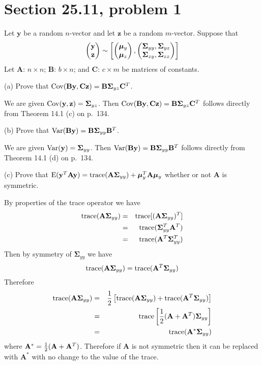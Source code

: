 
\section{Section 25.11, problem 1}
Let $\mathbf y$ be a random $n$-vector and let $\mathbf z$
be a random $m$-vector. Suppose that
\[
\begin{pmatrix}
\mathbf y\cr
\mathbf z
\end{pmatrix}\sim\left[
\begin{pmatrix}
\bm\mu_y\cr
\bm\mu_z
\end{pmatrix},\begin{pmatrix}
\bm\Sigma_{yy},\bm\Sigma_{yz}\cr
\bm\Sigma_{zy},\bm\Sigma_{zz}
\end{pmatrix}
\right]
\]
Let $\mathbf A$: $n\times n$;
$\mathbf B$: $b\times n$;
and $\mathbf C$: $c\times m$ be matrices of constants.

\bigskip
\noindent
(a) Prove that $\mathop{\rm Cov}(\mathbf{By},\mathbf{Cz})
=\mathbf{B\Sigma}_{yz}\mathbf C^T$.

\bigskip
\noindent
We are given $\mathop{\rm Cov}(\mathbf y,\mathbf z)=\bm\Sigma_{yz}$.
Then $\mathop{\rm Cov}(\mathbf{By},\mathbf{Cz})
=\mathbf{B\Sigma}_{yz}\mathbf C^T$
follows directly from Theorem 14.1 (c) on p.\ 134.

\bigskip
\noindent
(b) Prove that $\mathop{\rm Var}(\mathbf{By})
=\mathbf{B\Sigma}_{yy}\mathbf B^T$.

\bigskip
\noindent
We are given $\mathop{\rm Var}(\mathbf y)=\bm\Sigma_{yy}$.
Then $\mathop{\rm Var}(\mathbf{By})
=\mathbf{B\Sigma}_{yy}\mathbf B^T$
follows directly from Theorem 14.1 (d) on p.\ 134.

\bigskip
\noindent
(c) Prove that
$\mathrm E(\mathbf y^T\mathbf{Ay})
=\mathop{\rm trace}(\mathbf{A\Sigma}_{yy})
+\bm\mu_y^T\mathbf A\bm\mu_y$
whether or not $\mathbf A$ is symmetric.

\bigskip
\noindent
By properties of the trace operator we have
\begin{eqnarray*}
\mathop{\rm trace}(\mathbf A\bm\Sigma_{yy})
&=&\mathop{\rm trace}[(\mathbf A\bm\Sigma_{yy})^T]\\
&=&\mathop{\rm trace}(\bm\Sigma_{yy}^T\mathbf A^T)\\
&=&\mathop{\rm trace}(\mathbf A^T\bm\Sigma_{yy}^T)
\end{eqnarray*}
Then by symmetry of $\bm\Sigma_{yy}$ we have
$$
\mathop{\rm trace}(\mathbf A\bm\Sigma_{yy})
=\mathop{\rm trace}(\mathbf A^T\bm\Sigma_{yy})
$$
Therefore
\begin{eqnarray*}
\mathop{\rm trace}(\mathbf{A\Sigma}_{yy})
&=&
{1\over2}\left[
\mathop{\rm trace}(\mathbf{A\Sigma}_{yy})
+
\mathop{\rm trace}(\mathbf A^T\bm\Sigma_{yy})
\right]\\
&=&
\mathop{\rm trace}\left[
{1\over2}(\mathbf A+\mathbf A^T)\bm\Sigma_{yy}
\right]\\
&=&\mathop{\rm trace}(\mathbf A^*\bm\Sigma_{yy})
\end{eqnarray*}
where $\mathbf A^*={1\over2}(\mathbf A+\mathbf A^T)$.
Therefore if $\mathbf A$ is not symmetric then it can be replaced
with $\mathbf A^*$ with no change to the value of the trace.

